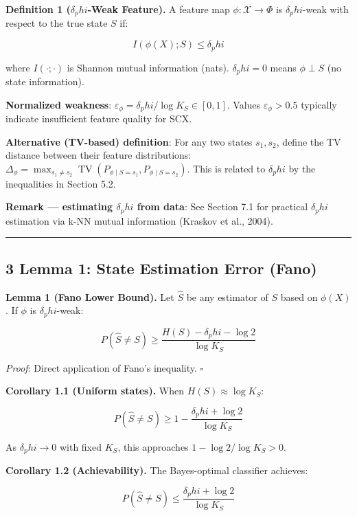 \documentclass[
  12pt,
]{ctexart}
\begin{document}
\textbf{Definition 1 (\(\delta_phi\)-Weak Feature).} A feature map
\(\phi: \mathcal{X} \to \Phi\) is \(\delta_phi\)-weak with respect to
the true state \(S\) if:

\[I(\phi(X); S) \leq \delta_phi\]

where \(I(\cdot; \cdot)\) is Shannon mutual information (nats).
\(\delta_phi = 0\) means \(\phi \perp S\) (no state information).

\textbf{Normalized weakness}:
\(\varepsilon_\phi = \delta_phi / \log K_S \in [0, 1]\). Values
\(\varepsilon_\phi > 0.5\) typically indicate insufficient feature
quality for SCX.

\textbf{Alternative (TV-based) definition}: For any two states
\(s_1, s_2\), define the TV distance between their feature
distributions:
\(\Delta_\phi = \max_{s_1 \neq s_2} \operatorname{TV}(P_{\phi \mid S=s_1}, P_{\phi \mid S=s_2})\).
This is related to \(\delta_phi\) by the inequalities in Section 5.2.

\textbf{Remark --- estimating \(\delta_phi\) from data}: See Section 7.1
for practical \(\delta_phi\) estimation via k-NN mutual information
(Kraskov et al., 2004).

\begin{center}\rule{0.5\linewidth}{0.5pt}\end{center}

\subsection{3 Lemma 1: State Estimation Error
(Fano)}\label{lemma-1-state-estimation-error-fano}

\textbf{Lemma 1 (Fano Lower Bound).} Let \(\hat{S}\) be any estimator of
\(S\) based on \(\phi(X)\). If \(\phi\) is \(\delta_phi\)-weak:

\[P(\hat{S} \neq S) \geq \frac{H(S) - \delta_phi - \log 2}{\log K_S}\]

\emph{Proof}: Direct application of Fano's inequality. \(\square\)

\textbf{Corollary 1.1 (Uniform states).} When \(H(S) \approx \log K_S\):

\[P(\hat{S} \neq S) \geq 1 - \frac{\delta_phi + \log 2}{\log K_S}\]

As \(\delta_phi \to 0\) with fixed \(K_S\), this approaches
\(1 - \log 2 / \log K_S > 0\).

\textbf{Corollary 1.2 (Achievability).} The Bayes-optimal classifier
achieves:

\[P(\hat{S} \neq S) \leq \frac{\delta_phi + \log 2}{\log K_S}\]
\end{document}
